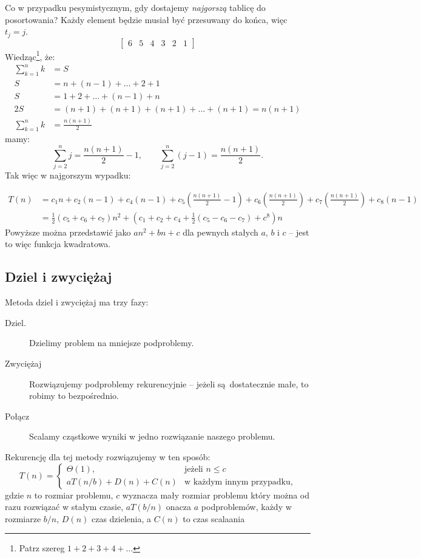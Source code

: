 \documentclass[10pt, oneside]{article}
\theoremstyle{remark}
\begin{document}
Co w przypadku pesymistycznym, gdy dostajemy \emph{najgorszą} tablicę do posortowania? Każdy element będzie musiał być przesuwany do końca, więc $t_j = j$.
$$
\begin{bmatrix}
	6 & 5 & 4 & 3 & 2 & 1
\end{bmatrix}$$
Wiedząc\footnote{Patrz szereg $1+2+3+4+\ldots$}, że:
\begin{align*}
\sum_{k=1}^n k &= S\\
S &= n + (n-1) + \ldots + 2 + 1\\
S &= 1 + 2  + \ldots + (n-1) + n\\
2S &= (n+1) + (n+1) + (n+1) + \ldots + (n+1) = n(n+1)\\
\sum_{k=1}^n k &= \frac{n(n+1)}{2}
\end{align*}
mamy:
$$\sum_{j=2}^n j = \frac{n(n+1)}{2} - 1, \qquad \sum_{j=2}^n \left(j - 1 \right) = \frac{n(n+1)}{2}.$$
Tak więc w najgorszym wypadku:

\begin{align*}
T(n) &= c_{1}n + c_2 (n-1) + c_4 (n-1) + c_5 \left ( \frac{n(n+1)}{2} - 1 \right ) + c_6 \left ( \frac{n(n+1)}{2} \right ) + c_7 \left ( \frac{n(n+1)}{2} \right ) + c_8 (n-1)\\
&= \frac{1}{2} \left(c_5 + c_6 + c_7 \right) n^2 + \left(c_1 + c_2 +c_4 + \frac{1}{2} \left(c_5 - c_6 - c_7\right) + c^8 \right)n
\end{align*}
Powyższe można przedstawić jako $an^2 + bn + c$ dla pewnych stałych $a$, $b$ i $c$ -- jest to więc funkcja kwadratowa.

\subsection{Dziel i zwyciężaj}

Metoda dziel i zwyciężaj ma trzy fazy:
\begin{description}
	\item[Dziel.] Dzielimy problem na mniejsze podproblemy.
	\item[Zwyciężaj] Rozwiązujemy podproblemy rekurencyjnie -- jeżeli są dostatecznie małe, to robimy to bezpośrednio.
	\item[Połącz] Scalamy cząstkowe wyniki w jedno rozwiązanie naszego problemu.
\end{description}

Rekurencję dla tej metody rozwiązujemy w ten sposób:
\begin{equation*}
T(n) = \begin{cases}
\Theta(1), &\text{jeżeli $n \leq c $}\\
aT(n/b) + D(n) + C(n) & \text{w każdym innym przypadku},
\end{cases}
\end{equation*}
gdzie $n$ to rozmiar problemu, $c$ wyznacza mały rozmiar problemu który można od razu rozwiązać w stałym czasie, $aT(b/n)$ onacza $a$ podproblemów, każdy w rozmiarze $b/n$, $D(n)$ czas dzielenia, a $C(n)$ to czas scalaania
\end{document}
